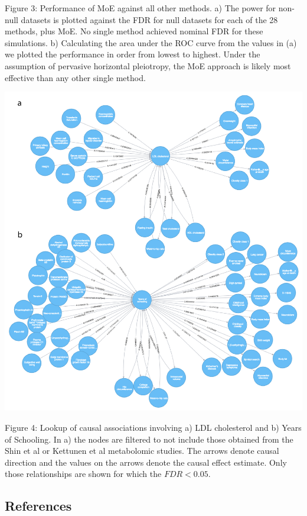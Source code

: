 \documentclass[]{article}
\begin{document}
Figure 3: Performance of MoE against all other methods. a) The power for
non-null datasets is plotted against the FDR for null datasets for each
of the 28 methods, plus MoE. No single method achieved nominal FDR for
these simulations. b) Calculating the area under the ROC curve from the
values in (a) we plotted the performance in order from lowest to
highest. Under the assumption of pervasive horizontal pleiotropy, the
MoE approach is likely most effective than any other single method.

\newpage

\includegraphics{images/fig4-01.png}

Figure 4: Lookup of causal associations involving a) LDL cholesterol and
b) Years of Schooling. In a) the nodes are filtered to not include those
obtained from the Shin et al or Kettunen et al metabolomic studies. The
arrows denote causal direction and the values on the arrows denote the
causal effect estimate. Only those relationships are shown for which the
\(FDR < 0.05\).

\newpage

\subsection{References}\label{references}
\end{document}
